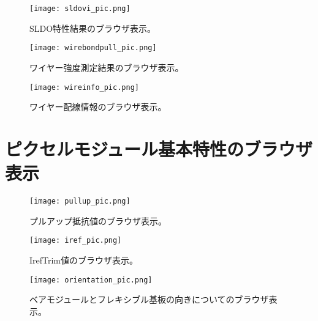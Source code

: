 \begin{figure}[h]
	\centering
	\texttt{[image: sldovi\_pic.png]}
	\caption[SLDO特性結果のブラウザ表示]{SLDO特性結果のブラウザ表示。}
	\label{fig:sldovi_pic}
\end{figure}

\begin{figure}[h]
	\centering
	\texttt{[image: wirebondpull\_pic.png]}
	\caption[ワイヤー強度測定結果のブラウザ表示]{ワイヤー強度測定結果のブラウザ表示。}
	\label{fig:wirebondpull_pic}
\end{figure}

\begin{figure}[h]
	\centering
	\texttt{[image: wireinfo\_pic.png]}
	\caption[ワイヤー配線情報のブラウザ表示]{ワイヤー配線情報のブラウザ表示。}
	\label{fig:wireinfo_pic}
\end{figure}



\section{ピクセルモジュール基本特性のブラウザ表示}
\label{sec:A2}


\begin{figure}[h]
	\centering
	\texttt{[image: pullup\_pic.png]}
	\caption[プルアップ抵抗値のブラウザ表示]{プルアップ抵抗値のブラウザ表示。}
	\label{fig:pullup_pic}
\end{figure}

\begin{figure}[h]
	\centering
	\texttt{[image: iref\_pic.png]}
	\caption[IrefTrim値のブラウザ表示]{IrefTrim値のブラウザ表示。}
	\label{fig:iref_pic}
\end{figure}

\begin{figure}[h]
	\centering
	\texttt{[image: orientation\_pic.png]}
	\caption[ベアモジュールとフレキシブル基板の向きについてのブラウザ表示]{ベアモジュールとフレキシブル基板の向きについてのブラウザ表示。}
	\label{fig:orientation_pic}
\end{figure}
